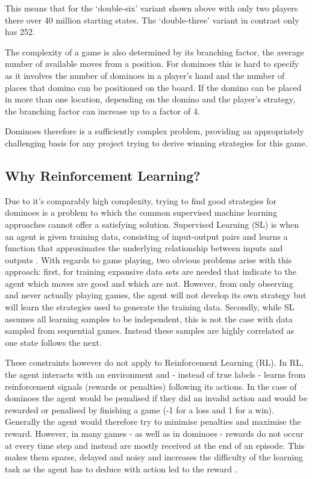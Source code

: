 \documentclass[12pt,a4paper]{article}
\begin{document}
This means that for the ‘double-six’ variant shown above with only two players there over 40 million starting states. The ‘double-three’ variant in contrast only has 252. 

The complexity of a game is also determined by its branching factor, the average number of available moves from a position. For dominoes this is hard to specify as it involves the number of dominoes in a player’s hand and the number of places that domino can be positioned on the board. If the domino can be placed in more than one location, depending on the domino and the player’s strategy, the branching factor can increase up to a factor of 4.

Dominoes therefore is a sufficiently complex problem, providing an appropriately challenging basis for any project trying to derive winning strategies for this game. 


\subsection{Why Reinforcement Learning?}
\label{sec:rl}
Due to it’s comparably high complexity, trying to find good strategies for dominoes is a problem to which the common supervised machine learning approaches cannot offer a satisfying solution. Supervised Learning (SL) is when an agent is given training data, consisting of input-output pairs and learns a function that approximates the underlying relationship between inputs and outputs  \citep{russell_artificial_2010}. With regards to game playing, two obvious problems arise with this approach: first, for training expansive data sets are needed that indicate to the agent which moves are good and which are not. However, from only observing and never actually playing games, the agent will not develop its own strategy but will learn the strategies used to generate the training data. Secondly, while SL assumes all learning samples to be independent, this is not the case with data sampled from sequential games. Instead these samples are highly correlated as one state follows the next. 

These constraints however do not apply to Reinforcement Learning (RL). In RL, the agent interacts with an environment and - instead of true labels - learns from reinforcement signals (rewards or penalties) following its actions. In the case of dominoes the agent would be penalised if they did an invalid action and would be rewarded or penalised by finishing a game (-1 for a loss and 1 for a win). Generally the agent would therefore try to minimise penalties and maximise the reward. However, in many games - as well as in dominoes - rewards do not occur at every time step and instead are mostly received at the end of an episode. This makes them sparse, delayed and noisy \citep{mnih_playing_2013} and increases the difficulty of the learning task as the agent has to deduce with action led to the reward \citep{lavet_introduction_2018}.
\end{document}
